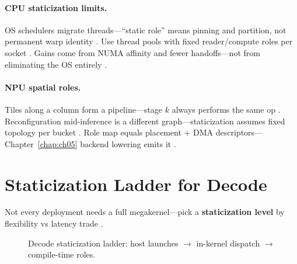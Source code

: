 \paragraph{CPU staticization limits.}
OS schedulers migrate threads---``static role'' means pinning and partition, not permanent warp identity \citep{dlbook,patel2025llminference}.
Use thread pools with fixed reader/compute roles per socket \citep{kwon2023vllm,memoryfloor2026}.
Gains come from NUMA affinity and fewer handoffs---not from eliminating the OS entirely \citep{taxbreak2026,chen2020compilerbasedhardw}.

\paragraph{NPU spatial roles.}
Tiles along a column form a pipeline---stage $k$ always performs the same op \citep{amd2024xdna,amd2024aie}.
Reconfiguration mid-inference is a different graph---staticization assumes fixed topology per bucket \citep{yirage2026,patel2025llminference}.
Role map equals placement + DMA descriptors---Chapter~\ref{chap:ch05} backend lowering emits it \citep{amd2024xdna,chen2020compilerbasedhardw}.

\section{Staticization Ladder for Decode}
\label{sec:ch07_static_levels}

Not every deployment needs a full megakernel---pick a \textbf{staticization level} by flexibility vs latency trade \citep{nvidia2024cudagraphs,mpk2025,patel2025llminference}.

\begin{figure}[t]
\centering
{}
\caption{Decode staticization ladder: host launches $\rightarrow$ in-kernel dispatch $\rightarrow$ compile-time roles.}
\label{fig:ch07_static_levels}
\end{figure}

